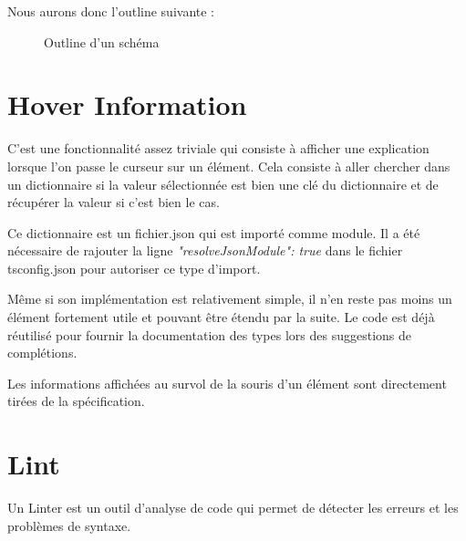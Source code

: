 \documentclass[
    iict, %
    il, %
]{heig-tb}
\begin{document}
Nous aurons donc l'outline suivante :

\begin{figure}[!h]
    \begin{center}
    \end{center}
    \caption[Outline d'un schéma]{\label{uon-schema-outline} Outline d'un schéma}
\end{figure}

\section{Hover Information}


C'est une fonctionnalité assez triviale qui consiste à afficher une explication lorsque l'on passe le curseur sur un élément.
Cela consiste à aller chercher dans un dictionnaire si la valeur sélectionnée est bien une clé du dictionnaire et de récupérer la valeur si c'est bien le cas.

Ce dictionnaire est un fichier.json qui est importé comme module. Il a été nécessaire de rajouter la ligne \emph{"resolveJsonModule": true} dans le fichier tsconfig.json pour autoriser ce type d'import.

Même si son implémentation est relativement simple, il n'en reste pas moins un élément fortement utile et pouvant être étendu par la suite.
Le code est déjà réutilisé pour fournir la documentation des types lors des suggestions de complétions.

Les informations affichées au survol de la souris d’un élément sont directement tirées de la spécification.

\section{Lint}
Un Linter est un outil d'analyse de code qui permet de détecter les erreurs et les problèmes de syntaxe.
\end{document}
